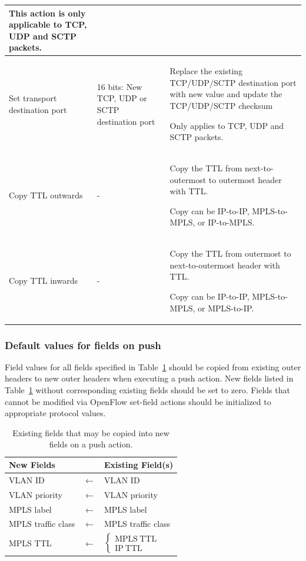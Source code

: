 \documentclass[10pt]{article}
\begin{document}
\begin{xtabular}{ |p{\atactionwidth}|p{\atassocwidth}|p{\atdescwidth}| }
This action is only applicable to TCP, UDP and SCTP packets.\\
\hline
Set transport destination port &
16 bits: New TCP, UDP or SCTP destination port &
Replace the existing TCP/UDP/SCTP destination port with new value and update the TCP/UDP/SCTP checksum

Only applies to TCP, UDP and SCTP packets.\\
\hline
Copy TTL outwards&
- &
Copy the TTL from next-to-outermost to outermost header with TTL.

Copy can be IP-to-IP, MPLS-to-MPLS, or IP-to-MPLS.
\\
\hline
Copy TTL inwards&
- &
Copy the TTL from outermost to next-to-outermost header with TTL.

Copy can be IP-to-IP, MPLS-to-MPLS, or MPLS-to-IP.
\\
\end{xtabular}

\subsubsection{Default values for fields on push}
\label{sec:push field defaults} 
Field values for all fields specified in Table~\ref{table:push field copy} should be copied from existing outer headers to new outer headers when executing a push action. New fields listed in Table~\ref{table:push field copy} without corresponding existing fields should be set to zero.  Fields that cannot be modified via OpenFlow set-field actions should be initialized to appropriate protocol values.

\begin{table}[hbp]
\centering
\begin{tabular}{lcl}
\textbf{New Fields} & & \textbf{Existing Field(s)} \\
\hline
VLAN ID & $\leftarrow$ & VLAN ID \\
VLAN priority & $\leftarrow$ & VLAN priority \\
MPLS label & $\leftarrow$ & MPLS label \\
MPLS traffic class & $\leftarrow$ & MPLS traffic class \\
MPLS TTL & $\leftarrow$ &
$\left\{
\begin{array}{l}
  \mathrm{MPLS\ TTL} \\ \mathrm{IP\ TTL}
\end{array}
\right.$ \\
\end{tabular}
\caption{Existing fields that may be copied into new fields on a push action.}
\label{table:push field copy}
\end{table}
\end{document}
